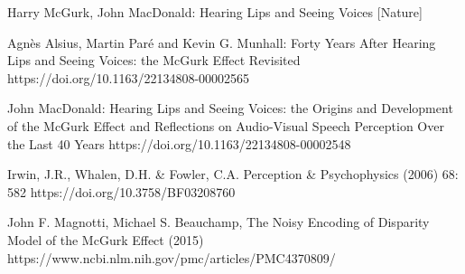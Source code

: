 \documentclass{article}
\begin{document}
\begin{thebibliography}{}
	 Harry McGurk, John MacDonald: Hearing Lips and Seeing Voices [Nature]

	Agnès Alsius, Martin Paré and Kevin G. Munhall: Forty Years After Hearing Lips and Seeing Voices: the McGurk Effect Revisited https://doi.org/10.1163/22134808-00002565

	John MacDonald: Hearing Lips and Seeing Voices: the Origins and Development of the McGurk Effect and Reﬂections on Audio-Visual Speech Perception Over the Last 40 Years https://doi.org/10.1163/22134808-00002548

	Irwin, J.R., Whalen, D.H. & Fowler, C.A. Perception & Psychophysics (2006) 68: 582 https://doi.org/10.3758/BF03208760

	John F. Magnotti, Michael S. Beauchamp, The Noisy Encoding of Disparity Model of the McGurk Effect (2015) https://www.ncbi.nlm.nih.gov/pmc/articles/PMC4370809/

\end{thebibliography}
\end{document}
